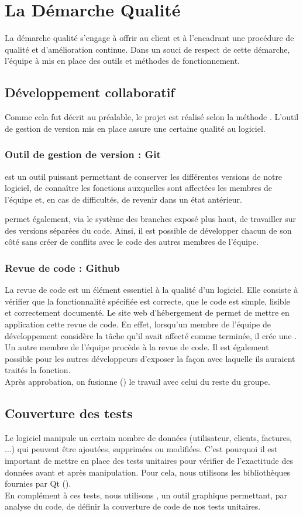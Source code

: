 \chapter{La Démarche Qualité}
La démarche qualité s'engage à offrir au client et à l'encadrant une procédure de qualité et d'amélioration continue. 
Dans un souci de respect de cette démarche, l'équipe à mis en place des outils et méthodes de fonctionnement. 
\section{Développement collaboratif}
Comme cela fut décrit au préalable, le projet est réalisé selon la méthode . L'outil de gestion de version  mis en place assure une certaine qualité au logiciel.
\subsection{Outil de gestion de version : Git}
 est un outil puissant permettant de conserver les différentes versions de notre logiciel, de connaître les fonctions auxquelles sont affectées les membres de l'équipe et, en cas de difficultés, de revenir dans un état antérieur. 

 permet également, via le système des branches exposé plus haut, de travailler sur des versions séparées du code. Ainsi, il est possible de développer chacun de son côté sans créer de conflits avec le code des autres membres de l'équipe. 
\subsection{Revue de code : Github}
La revue de code est un élément essentiel à la qualité d'un logiciel. Elle consiste à vérifier que la fonctionnalité spécifiée est correcte, que le code est simple, lisible et correctement documenté. Le site web d'hébergement  de  permet de mettre en application cette revue de code. En effet, lorsqu'un membre de l'équipe de développement considère la tâche qu'il avait affecté comme terminée, il crée une . Un autre membre de l'équipe procède à la revue de code. Il est également possible pour les autres développeurs d'exposer la façon avec laquelle ils auraient traités la fonction. \\
Après approbation, on fusionne () le travail avec celui du reste du groupe. 
\section{Couverture des tests}
Le logiciel \FactDev  manipule un certain nombre de données (utilisateur, clients, factures, ...) qui peuvent être ajoutées, supprimées ou modifiées. C'est pourquoi il est important de mettre en place des tests unitaires pour vérifier de l'exactitude des données avant et après manipulation. Pour cela, nous utilisons les bibliothèques fournies par Qt (). \\
En complément à ces tests, nous utilisons , un outil graphique permettant, par analyse du code, de définir la couverture de code de nos tests unitaires. 
